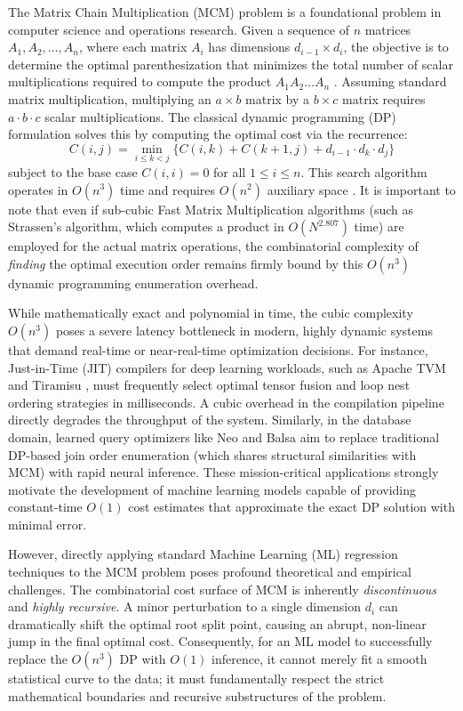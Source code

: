 \documentclass[conference]{IEEEtran}
\begin{document}
The Matrix Chain Multiplication (MCM) problem is a foundational problem in computer science and operations research. Given a sequence of $n$ matrices $A_1, A_2, \ldots, A_n$, where each matrix $A_i$ has dimensions $d_{i-1} \times d_i$, the objective is to determine the optimal parenthesization that minimizes the total number of scalar multiplications required to compute the product $A_1 A_2 \ldots A_n$ \cite{b1, b4}. Assuming standard matrix multiplication, multiplying an $a \times b$ matrix by a $b \times c$ matrix requires $a \cdot b \cdot c$ scalar multiplications. The classical dynamic programming (DP) formulation solves this by computing the optimal cost via the recurrence:
\begin{equation}
C(i,j) = \min_{i \le k < j} \{C(i,k) + C(k{+}1,j) + d_{i-1} \cdot d_k \cdot d_j\}
\label{eq:dp}
\end{equation}
subject to the base case $C(i,i) = 0$ for all $1 \le i \le n$. This search algorithm operates in $O(n^3)$ time and requires $O(n^2)$ auxiliary space \cite{b1}. It is important to note that even if sub-cubic Fast Matrix Multiplication algorithms (such as Strassen's algorithm, which computes a product in $O(N^{2.807})$ time) are employed for the actual matrix operations, the combinatorial complexity of \textit{finding} the optimal execution order remains firmly bound by this $O(n^3)$ dynamic programming enumeration overhead.

While mathematically exact and polynomial in time, the cubic complexity $O(n^3)$ poses a severe latency bottleneck in modern, highly dynamic systems that demand real-time or near-real-time optimization decisions. 
For instance, Just-in-Time (JIT) compilers for deep learning workloads, such as Apache TVM \cite{b23} and Tiramisu \cite{b24}, must frequently select optimal tensor fusion and loop nest ordering strategies in milliseconds. A cubic overhead in the compilation pipeline directly degrades the throughput of the system. Similarly, in the database domain, learned query optimizers like Neo \cite{b17} and Balsa \cite{b19} aim to replace traditional DP-based join order enumeration (which shares structural similarities with MCM) with rapid neural inference. These mission-critical applications strongly motivate the development of machine learning models capable of providing constant-time $O(1)$ cost estimates that approximate the exact DP solution with minimal error.

However, directly applying standard Machine Learning (ML) regression techniques to the MCM problem poses profound theoretical and empirical challenges. The combinatorial cost surface of MCM is inherently \textit{discontinuous} and \textit{highly recursive}. A minor perturbation to a single dimension $d_i$ can dramatically shift the optimal root split point, causing an abrupt, non-linear jump in the final optimal cost. Consequently, for an ML model to successfully replace the $O(n^3)$ DP with $O(1)$ inference, it cannot merely fit a smooth statistical curve to the data; it must fundamentally respect the strict mathematical boundaries and recursive substructures of the problem.
\end{document}
